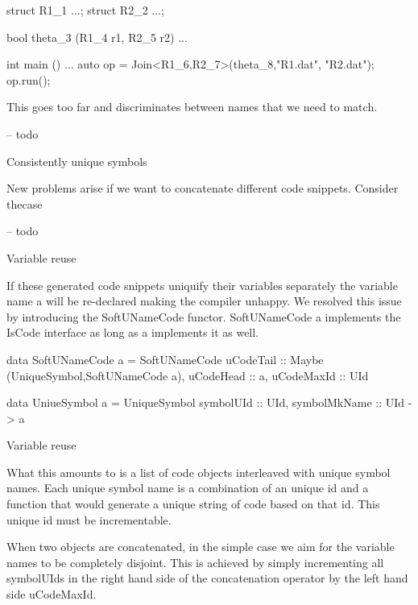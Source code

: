 \begin{cppcode}
struct R1_1 {...};
struct R2_2 {...};

bool theta_3 (R1_4 r1, R2_5 r2) {
  ...
}

int main () {
  ...
  auto op = Join<R1_6,R2_7>(theta_8,"R1.dat", "R2.dat");
  op.run();
}
\end{cppcode}

This goes too far and discriminates between names that we need to
match.

\begin{code}
\begin{haskellcode}
-- todo
\end{haskellcode}
\caption{Consistently unique symbols}
\end{code}

New problems arise if we want to concatenate different code
snippets. Consider thecase


\begin{code}
\begin{haskellcode}
-- todo
\end{haskellcode}
\caption{Variable reuse}
\end{code}

If these generated code snippets uniquify their variables separately
the variable name a will be re-declared making the compiler
unhappy. We resolved this issue by introducing the SoftUNameCode
functor. SoftUNameCode a implements the IsCode interface as long as a
implements it as well.

\begin{code}
\begin{haskellcode}
data SoftUNameCode a = SoftUNameCode {
  uCodeTail :: Maybe (UniqueSymbol,SoftUNameCode a),
  uCodeHead :: a,
  uCodeMaxId :: UId
  }

data UniueSymbol a = UniqueSymbol {
  symbolUId :: UId,
  symbolMkName :: UId -> a
  }
\end{haskellcode}
\caption{Variable reuse}
\end{code}

What this amounts to is a list of code objects interleaved with unique
symbol names. Each unique symbol name is a combination of an unique id
and a function that would generate a unique string of code based on
that id. This unique id must be incrementable.

When two  objects are concatenated, in the simple case
we aim for the variable names to be completely disjoint. This is
achieved by simply incrementing all symbolUIds in the right hand side
of the concatenation operator by the left hand side uCodeMaxId.

